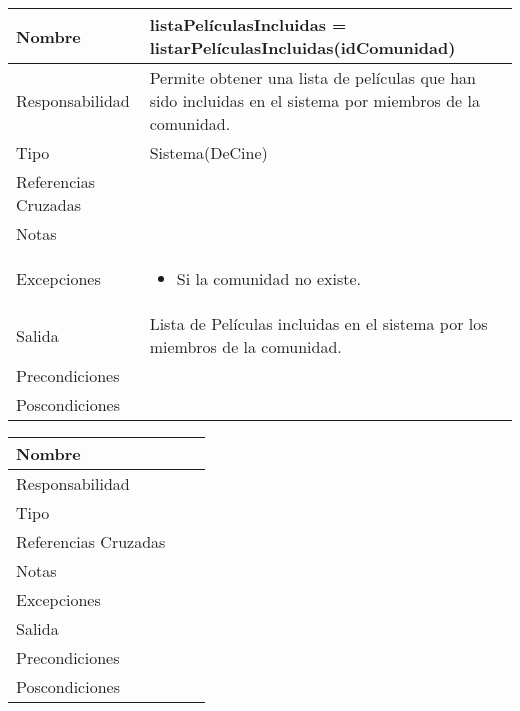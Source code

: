 \documentclass{article}
\begin{document}
\begin{table}[h]
\begin{tabular}{|l|l|l|l|l|l|}
\hline
\multicolumn{2}{|p{3cm}|}{Nombre} & \multicolumn{4}{p{10cm}|}{\textbf{listaPelículasIncluidas = listarPelículasIncluidas(idComunidad)}}\\
\hline
\multicolumn{2}{|p{3cm}|}{Responsabilidad} & \multicolumn{4}{p{10cm}|}{Permite obtener una lista de películas que han sido incluidas en el sistema por miembros de la comunidad.} \\
\hline
\multicolumn{2}{|p{3cm}|}{Tipo} & \multicolumn{4}{p{10cm}|}{Sistema(DeCine)} \\
\hline
\multicolumn{2}{|p{3cm}|}{Referencias Cruzadas} & \multicolumn{4}{p{10cm}|}{} \\
\hline
\multicolumn{2}{|p{3cm}|}{Notas} & \multicolumn{4}{p{10cm}|}{} \\
\hline
\multicolumn{2}{|p{3cm}|}{Excepciones} & \multicolumn{4}{p{10cm}|}{\begin{itemize}
\item Si la comunidad no existe.
\end{itemize}} \\
\hline
\multicolumn{2}{|p{3cm}|}{Salida} & \multicolumn{4}{p{10cm}|}{Lista de Películas incluidas en el sistema por los miembros de la comunidad.} \\
\hline
\multicolumn{2}{|p{3cm}|}{Precondiciones} & \multicolumn{4}{p{10cm}|}{} \\
\hline
\multicolumn{2}{|p{3cm}|}{Poscondiciones} & \multicolumn{4}{p{10cm}|}{} \\
\hline
\end{tabular}
\end{table}
\begin{table}[h]
\begin{tabular}{|l|l|l|l|l|l|}
\hline
\multicolumn{2}{|p{3cm}|}{Nombre} & \multicolumn{3}{p{10cm}|}{}\\
\hline
\multicolumn{2}{|p{3cm}|}{Responsabilidad} & \multicolumn{4}{p{10cm}|}{} \\
\hline
\multicolumn{2}{|p{3cm}|}{Tipo} & \multicolumn{4}{p{10cm}|}{} \\
\hline
\multicolumn{2}{|p{3cm}|}{Referencias Cruzadas} & \multicolumn{4}{p{10cm}|}{} \\
\hline
\multicolumn{2}{|p{3cm}|}{Notas} & \multicolumn{4}{p{10cm}|}{} \\
\hline
\multicolumn{2}{|p{3cm}|}{Excepciones} & \multicolumn{4}{p{10cm}|}{} \\
\hline
\multicolumn{2}{|p{3cm}|}{Salida} & \multicolumn{4}{p{10cm}|}{} \\
\hline
\multicolumn{2}{|p{3cm}|}{Precondiciones} & \multicolumn{4}{p{10cm}|}{} \\
\hline
\multicolumn{2}{|p{3cm}|}{Poscondiciones} & \multicolumn{4}{p{10cm}|}{} \\
\hline
\end{tabular}
\end{table}
	
\end{document}
